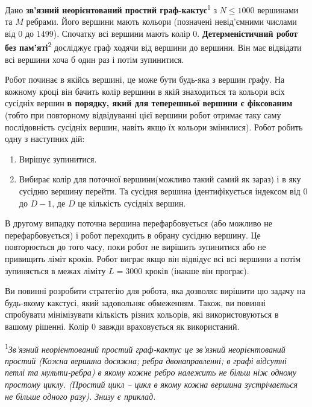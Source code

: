 \documentclass[12pt]{article}
\begin{document}
\renewcommand{\round}{Day 2}
\renewcommand{\problemName}{Task Navigation}
\renewcommand{\lang}{Ukrainian}

\renewcommand{\tl}{$3$ sec.}
\renewcommand{\ml}{$512$ MB}

Дано \textbf{зв'язний неорієнтований простий граф-кактус}\textsuperscript{1} з $N \leq 1000$ вершинами та $M$ ребрами.
Його вершини мають кольори (позначені невід'ємними числами від $0$ до $1499$).
Спочатку всі вершини мають колір 0.
\textbf{Детерменістичний робот без пам'яті}\textsuperscript{2} досліджує граф ходячи від вершини до вершини.
Він має відвідати всі вершини хоча б один раз і потім зупинитися.

Робот починає в якійсь вершині, це може бути будь-яка з вершин графу.
На кожному кроці він бачить колір вершини в якій знаходиться та кольори всіх сусідніх вершин
\textbf{в порядку, який для теперешньої вершини є фіксованим}
(тобто при повторному відвідуванні цієї вершини робот отримає таку саму послідовність сусідніх вершин,
навіть якщо їх кольори змінилися).
Робот робить одну з наступних дій:

\begin{enumerate}
    \item Вирішує зупинитися.
    \item Вибирає колір для поточної вершини(можливо такий самий як зараз) і в яку сусідню вершину перейти. 
    Та сусідня вершина ідентифікується індексом від $0$ до $D-1$, де $D$ це кількість сусідніх вершин.
\end{enumerate}

В другому випадку поточна вершина перефарбовується (або можливо не  перефарбовується)
і робот переходить в обрану сусідню вершину. Це повторюється до того часу, поки робот не вирішить зупинитися або не привищить ліміт кроків. Робот виграє якщо він відвідує всі всі вершини а потім зупиняється в межах ліміту $L = 3000$ кроків (інакше він програє).


Ви повинні розробити стратегію для робота, яка дозволяє вирішити цю задачу на будь-якому какстусі, який задовольняє обмеженням. Також, ви повинні спробувати мінімізувати кількість різних кольорів, які використовуються в вашому рішенні. Колір 0 завжди враховується як використаний.

\textsuperscript{1}\textit{Зв'язний неорієнтований простий граф-кактус це зв'язний неорієнтований простий (Кожна вершина досяжна; ребра двонаправленні; в графі відсутні петлі та мульти-ребра) в якому кожне ребро належить не більш ніж одному простому циклу. (Простий цикл -- цикл в якому кожна вершина зустрічається не більше одного разу). Знизу є приклад.}
\end{document}
